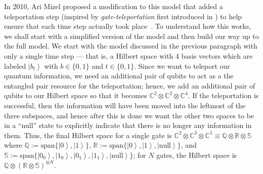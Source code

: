\documentclass[12pt]{amsbook}
\theoremstyle{plain}
\theoremstyle{definition}
\theoremstyle{remark}
\newcommand{\ket}[1]{\left|#1\right>}
\newcommand{\paren}[1]{\left(#1\right)}
\begin{document}
In 2010, Ari Mizel proposed a modification to this model that added a teleportation step (inspired by \emph{gate-teleportation} first introduced in \cite{Gottesman1999}) to help ensure that each time step actually took place~\cite{Mizel2010}.  To understand how this works, we shall start with a simplified version of the model and then build our way up to the full model.  We start with the model discussed in the previous paragraph with only a single time step --- that is, a Hilbert space with 4 basis vectors which are labeled $\ket{b_t}$ with $b\in\{0,1\}$ and $t\in\{0,1\}$.  Since we want to teleport our quantum information, we need an additional pair of qubits to act as a the entangled pair resource for the teleportation;  hence, we add an additional pair of qubits to our Hilbert space so that it becomes $\mathbb{C}^2\otimes\mathbb{C}^2\otimes\mathbb{C}^4$.  If the teleportation is successful, then the information will have been moved into the leftmost of the three subspaces, and hence after this is done we want the other two spaces to be in a ``null'' state to explicitly indicate that there is no longer any information in them.  Thus, the final Hilbert space for a single gate is $\mathbb{C}^2\otimes\mathbb{C}^3\otimes\mathbb{C}^5\equiv\mathbb{Q}\otimes\mathbb{R}\otimes\mathbb{S}$ where $\mathbb{Q}:=\text{span}\{\ket{0},\ket{1}\}$, $\mathbb{R}:=\text{span}\{\ket{0},\ket{1},\ket{\text{null}}\}$, and $\mathbb{S}:=\text{span}\{\ket{0_0},\ket{1_0},\ket{0_1},\ket{1_1},\ket{\text{null}}\}$;  for $N$ gates, the Hilbert space is $\mathbb{Q}\otimes\paren{\mathbb{R}\otimes\mathbb{S}}^{\otimes N}$.
\end{document}
